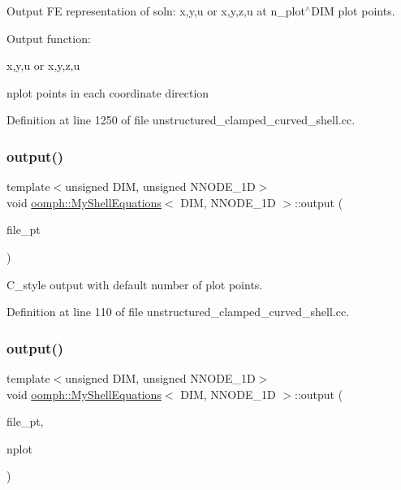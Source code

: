Output FE representation of soln\+: x,y,u or x,y,z,u at n\+\_\+plot$^\wedge$\+D\+IM plot points. 

Output function\+:

x,y,u or x,y,z,u

nplot points in each coordinate direction 

Definition at line 1250 of file unstructured\+\_\+clamped\+\_\+curved\+\_\+shell.\+cc.

\mbox{\label{classoomph_1_1MyShellEquations_aa8411334811e9b382d2c96051ac4b2ba}} 
\subsubsection{\texorpdfstring{output()}{output()}\hspace{0.1cm}{\footnotesize\ttfamily [3/4]}}
{\footnotesize\ttfamily template$<$unsigned D\+IM, unsigned N\+N\+O\+D\+E\+\_\+1D$>$ \\
void \hyperlink{classoomph_1_1MyShellEquations}{oomph\+::\+My\+Shell\+Equations}$<$ D\+IM, N\+N\+O\+D\+E\+\_\+1D $>$\+::output (\begin{DoxyParamCaption}\item[{F\+I\+LE $\ast$}]{file\+\_\+pt }\end{DoxyParamCaption})\hspace{0.3cm}{\ttfamily [inline]}}



C\+\_\+style output with default number of plot points. 



Definition at line 110 of file unstructured\+\_\+clamped\+\_\+curved\+\_\+shell.\+cc.

\mbox{\label{classoomph_1_1MyShellEquations_adc1fcb6052b2cd07efe4d7d841ed6723}} 
\subsubsection{\texorpdfstring{output()}{output()}\hspace{0.1cm}{\footnotesize\ttfamily [4/4]}}
{\footnotesize\ttfamily template$<$unsigned D\+IM, unsigned N\+N\+O\+D\+E\+\_\+1D$>$ \\
void \hyperlink{classoomph_1_1MyShellEquations}{oomph\+::\+My\+Shell\+Equations}$<$ D\+IM, N\+N\+O\+D\+E\+\_\+1D $>$\+::output (\begin{DoxyParamCaption}\item[{F\+I\+LE $\ast$}]{file\+\_\+pt,  }\item[{const unsigned \&}]{nplot }\end{DoxyParamCaption})}



